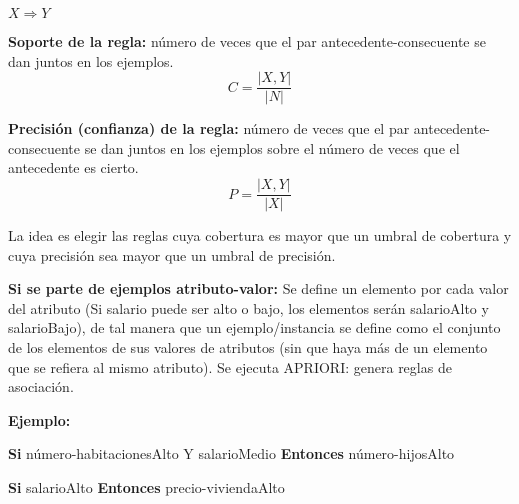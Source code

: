 \documentclass[12pt, twoside, openright]{report} %
\begin{document}
\begin{center}
	$X \Rightarrow Y$
\end{center}

\textbf{Soporte de la regla:} número de veces que el par antecedente-consecuente se dan juntos en los ejemplos.
$$C = \frac{|X, Y|}{|N|}$$

\textbf{Precisión (confianza) de la regla:} número de veces que el par antecedente-consecuente se dan juntos en los ejemplos sobre el número de veces que el antecedente es cierto.
$$P = \frac{|X, Y|}{|X|}$$

La idea es elegir las reglas cuya cobertura es mayor que un umbral de cobertura y cuya precisión sea mayor que un umbral de precisión.

\textbf{Si se parte de ejemplos atributo-valor:} Se define un elemento por cada valor del atributo (Si salario puede ser alto o bajo, los elementos serán salarioAlto y salarioBajo), de tal manera que un ejemplo/instancia se define como el conjunto de los elementos de sus valores de atributos (sin que haya más de un elemento que se refiera al mismo atributo). Se ejecuta APRIORI: genera reglas de asociación.

\textbf{Ejemplo:}

\textbf{Si} número-habitacionesAlto Y salarioMedio \textbf{Entonces} número-hijosAlto

\textbf{Si} salarioAlto \textbf{Entonces} precio-viviendaAlto
\end{document}
